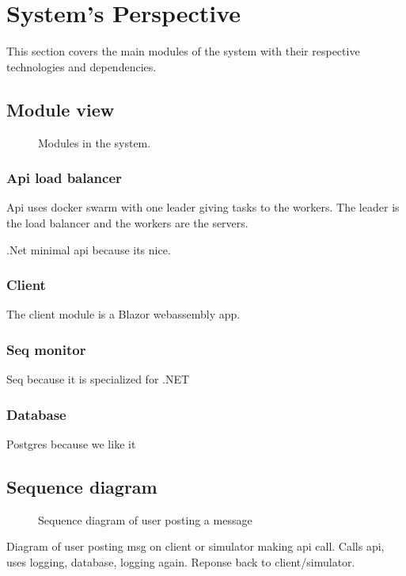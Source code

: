 \section{System's Perspective}
\label{ch:sys_persp} %

This section covers the main modules of the system with their  
respective technologies and dependencies.

\subsection{Module view}



\begin{figure}[H]
    \centering
    
    \caption{Modules in the system.}
    \label{fig:modules}
\end{figure}

\subsubsection{Api load balancer}

Api uses docker swarm with one leader giving tasks 
to the workers. The leader is the load balancer 
and the workers are the servers. 

.Net minimal api because its nice.

\subsubsection{Client}

The client module is a Blazor webassembly app.

\subsubsection{Seq monitor}

Seq\cite{seq} because it is specialized for .NET

\subsubsection{Database}

Postgres because we like it


\subsection{Sequence diagram}
\begin{figure}[H]
    \centering
    
    \caption{Sequence diagram of user posting a message}
    \label{fig:seq_diagram}
\end{figure}

Diagram of user posting msg on client or simulator making api call. 
Calls api, uses logging, database, logging again. Reponse back to client/simulator.

\begin{figure}[H]
    \centering
    \caption{}
    \label{fig:sequence_diagram}
\end{figure}
